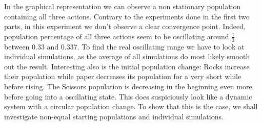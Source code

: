 \documentclass[a4paper, 11pt]{article}
\begin{document}
\begin{landscape}
In the graphical representation we can observe a non stationary population containing all three actions. Contrary to the experiments done in the first two parts, in this experiment we don't observe a clear convergence point. Indeed, population percentage of all three actions seem to be oscillating around $\frac{1}{3}$ between $0.33$ and $0.337$. To find the real oscillating range we have to look at individual simulations, as the average of all simulations do most likely smooth out the result. Interesting also is the initial population change: Rocks increase their population while paper decreases its population for a very short while before rising. The Scissors population is decreasing in the beginning even more before going into a oscillating state. This does suspiciously look like a dynamic system with a circular population change. To show that this is the case, we shall investigate non-equal starting populations and individual simulations.

\end{landscape}
\end{document}
